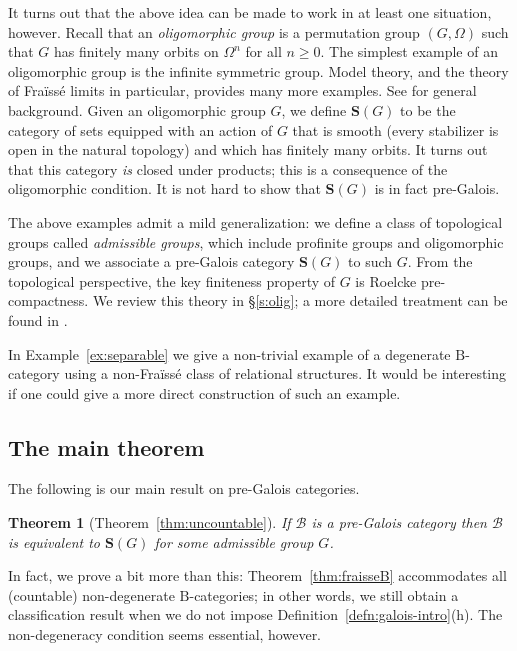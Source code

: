 \documentclass[12pt]{amsart}
\numberwithin{equation}{section}
\newtheorem{theorem}[equation]{Theorem}
\theoremstyle{definition}
\newcommand{\cB}{\mathcal{B}}
\newcommand{\rB}{\mathrm{B}}
\newcommand{\bS}{\mathbf{S}}
\newcommand{\defn}[1]{\emph{#1}}
\begin{document}
It turns out that the above idea can be made to work in at least one situation, however. Recall that an \defn{oligomorphic group} is a permutation group $(G, \Omega)$ such that $G$ has finitely many orbits on $\Omega^n$ for all $n \ge 0$. The simplest example of an oligomorphic group is the infinite symmetric group. Model theory, and the theory of Fra\"iss\'e limits in particular, provides many more examples. See \cite{CameronBook} for general background. Given an oligomorphic group $G$, we define $\bS(G)$ to be the category of sets equipped with an action of $G$ that is smooth (every stabilizer is open in the natural topology) and which has finitely many orbits. It turns out that this category \emph{is} closed under products; this is a consequence of the oligomorphic condition. It is not hard to show that $\bS(G)$ is in fact pre-Galois.

The above examples admit a mild generalization: we define a class of topological groups called \defn{admissible groups}, which include profinite groups and oligomorphic groups, and we associate a pre-Galois category $\bS(G)$ to such $G$. From the topological perspective, the key finiteness property of $G$ is Roelcke pre-compactness. We review this theory in \S \ref{s:olig}; a more detailed treatment can be found in \cite[\S 2]{repst}.

In Example~\ref{ex:separable} we give a non-trivial example of a degenerate $\rB$-category using a non-Fra\"iss\'e class of relational structures. It would be interesting if one could give a more direct construction of such an example.

\subsection{The main theorem}

The following is our main result on pre-Galois categories.

\begin{theorem}[Theorem~\ref{thm:uncountable}] \label{mainthm}
If $\cB$ is a pre-Galois category then $\cB$ is equivalent to $\bS(G)$ for some admissible group $G$.
\end{theorem}

In fact, we prove a bit more than this: Theorem~\ref{thm:fraisseB} accommodates all (countable) non-degenerate $\rB$-categories; in other words, we still obtain a classification result when we do not impose Definition~\ref{defn:galois-intro}(h). The non-degeneracy condition seems essential, however.
\end{document}
